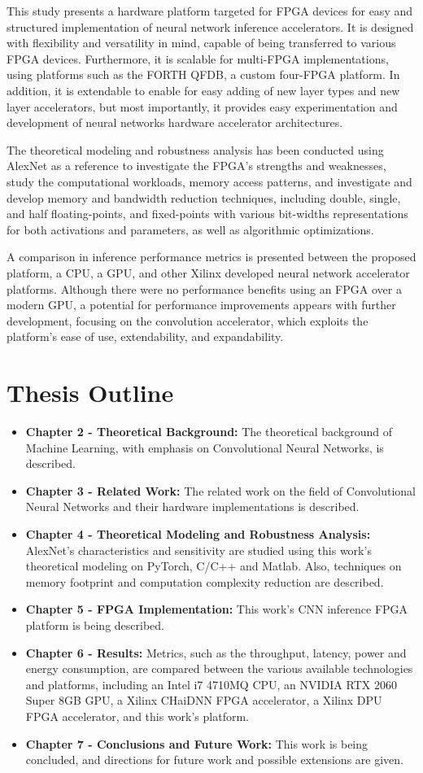 This study presents a hardware platform targeted for FPGA devices for easy and structured implementation of neural network inference accelerators. It is designed with flexibility and versatility in mind, capable of being transferred to various FPGA devices. Furthermore, it is scalable for multi-FPGA implementations, using platforms such as the FORTH QFDB, a custom four-FPGA platform. In addition, it is extendable to enable for easy adding of new layer types and new layer accelerators, but most importantly, it provides easy experimentation and development of neural networks hardware accelerator architectures.

The theoretical modeling and robustness analysis has been conducted using AlexNet as a reference to investigate the FPGA's strengths and weaknesses, study the computational workloads, memory access patterns, and investigate and develop memory and bandwidth reduction techniques, including double, single, and half floating-points, and fixed-points with various bit-widths representations for both activations and parameters, as well as algorithmic optimizations.

A comparison in inference performance metrics is presented between the proposed platform, a CPU, a GPU, and other Xilinx developed neural network accelerator platforms. Although there were no performance benefits using an FPGA over a modern GPU, a potential for performance improvements appears with further development, focusing on the convolution accelerator, which exploits the platform's ease of use, extendability, and expandability.

\section{Thesis Outline}
\begin{itemize}
	\item \textbf{Chapter 2 - Theoretical Background:} The theoretical background of Machine Learning, with emphasis on Convolutional Neural Networks, is described.
	\item \textbf{Chapter 3 - Related Work:} The related work on the field of Convolutional Neural Networks and their hardware implementations is described.
	\item \textbf{Chapter 4 - Theoretical Modeling and Robustness Analysis:} AlexNet's characteristics and sensitivity are studied using this work's theoretical modeling on PyTorch, C/C++ and Matlab. Also, techniques on memory footprint and computation complexity reduction are described.
	\item \textbf{Chapter 5 - FPGA Implementation:} This work's CNN inference FPGA platform is being described.
	\item \textbf{Chapter 6 - Results:} Metrics, such as the throughput, latency, power and energy consumption, are compared between the various available technologies and platforms, including an Intel i7 4710MQ CPU, an NVIDIA RTX 2060 Super 8GB GPU, a Xilinx CHaiDNN FPGA accelerator, a Xilinx DPU FPGA accelerator, and this work's platform.
	\item \textbf{Chapter 7 - Conclusions and Future Work:} This work is being concluded, and directions for future work and possible extensions are given.
\end{itemize}
